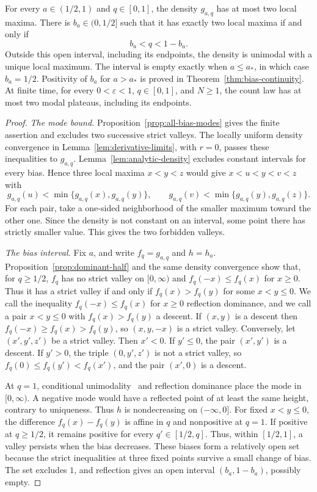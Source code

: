\begin{theorem}\label{thm:biased-limit-modes}
For every $a\in(1/2,1)$ and $q\in[0,1]$, the density $g_{a,q}$ has at
most two local maxima. There is $b_a\in(0,1/2]$ such that it has exactly
two local maxima if and only if
\[
                 b_a<q<1-b_a.
\]
Outside this open interval, including its endpoints, the density is
unimodal with a unique local maximum. The interval is empty exactly when
$a\le a_*$, in which case $b_a=1/2$. Positivity of $b_a$ for
$a>a_*$ is proved in Theorem~\ref{thm:bias-continuity}.
At finite time, for every $0<\varepsilon<1$, $q\in[0,1]$, and
$N\ge1$, the count law has at most two modal plateaus, including its
endpoints.
\end{theorem}

\begin{proof}
\emph{The mode bound.} Proposition~\ref{prop:all-bias-modes}
gives the finite assertion and excludes two successive strict valleys.
The locally uniform density convergence in
Lemma~\ref{lem:derivative-limits}, with $r=0$, passes these
inequalities to $g_{a,q}$.
Lemma~\ref{lem:analytic-density} excludes constant intervals
for every bias. Hence three local maxima $x<y<z$
would give
$x<u<y<v<z$ with
\[
 g_{a,q}(u)<\min\{g_{a,q}(x),g_{a,q}(y)\},\qquad
 g_{a,q}(v)<\min\{g_{a,q}(y),g_{a,q}(z)\}.
\]
For each pair, take a one-sided neighborhood of the smaller maximum
toward the other one. Since the density is not constant on an
interval, some point there has strictly smaller value. This gives
the two forbidden valleys.

\emph{The bias interval.} Fix $a$, and write $f_q=g_{a,q}$ and $h=h_a$.
Proposition~\ref{prop:dominant-half} and the same density convergence show that,
for $q\ge1/2$, $f_q$ has no strict valley on $[0,\infty)$ and
$f_q(-x)\le f_q(x)$ for $x\ge0$.
Thus it has a strict valley if and only if
$f_q(x)>f_q(y)$ for some $x<y\le0$. We call the inequality
$f_q(-x)\le f_q(x)$ for $x\ge0$ reflection dominance, and we call a
pair $x<y\le0$ with $f_q(x)>f_q(y)$ a descent. If $(x,y)$ is a descent
then $f_q(-x)\ge f_q(x)>f_q(y)$, so $(x,y,-x)$ is a strict valley. Conversely, let
$(x',y',z')$ be a strict valley. Then $x'<0$. If $y'\le0$, the pair
$(x',y')$ is a descent. If $y'>0$, the triple $(0,y',z')$ is not a
strict valley, so $f_q(0)\le f_q(y')<f_q(x')$, and the pair $(x',0)$
is a descent.

At $q=1$, conditional unimodality~\cite{glrs2025} and reflection
dominance place the mode in $[0,\infty)$. A negative mode would have
a reflected point of at least the same height, contrary to uniqueness.
Thus $h$ is nondecreasing on $(-\infty,0]$. For fixed $x<y\le0$, the
difference $f_q(x)-f_q(y)$ is affine in $q$ and nonpositive at $q=1$.
If positive at $q\ge1/2$, it remains positive for every $q'\in[1/2,q]$.
Thus, within $[1/2,1]$, a valley persists when the bias decreases.
These biases form a relatively open set because the strict
inequalities at three fixed points survive a small change of bias.
The set excludes $1$, and reflection gives an open interval
$(b_a,1-b_a)$, possibly empty.


\end{proof}
